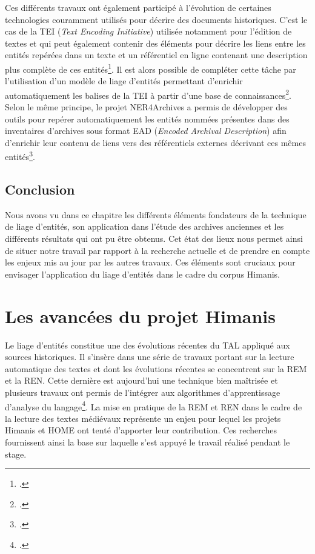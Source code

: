 \documentclass[a4paper,12pt,twoside]{book}
\begin{document}
	Ces différents travaux ont également participé à l'évolution de certaines technologies couramment utilisés pour décrire des documents historiques. C'est le cas de la TEI (\textit{Text Encoding Initiative}) utilisée notamment pour l'édition de textes et qui peut également contenir des éléments pour décrire les liens entre les entités repérées dans un texte et un référentiel en ligne contenant une description plus complète de ces entités\footcite{frontini_annotation_2016}. Il est alors possible de compléter cette tâche par l'utilisation d'un modèle de liage d'entités permettant d'enrichir automatiquement les balises de la TEI à partir d'une base de connaissances\footcite{brando_reden_2016}. Selon le même principe, le projet NER4Archives a permis de développer des outils pour repérer automatiquement les entités nommées présentes dans des inventaires d'archives sous format EAD (\textit{Encoded Archival Description}) afin d'enrichir leur contenu de liens vers des référentiels externes décrivant ces mêmes entités\footcite{clavaud_ner4archives_nodate}.
	
	\section*{Conclusion}
	
	Nous avons vu dans ce chapitre les différents éléments fondateurs de la technique de liage d'entités, son application dans l'étude des archives anciennes et les différents résultats qui ont pu être obtenus. Cet état des lieux nous permet ainsi de situer notre travail par rapport à la recherche actuelle et de prendre en compte les enjeux mis au jour par les autres travaux. Ces éléments sont cruciaux pour envisager l'application du liage d'entités dans le cadre du corpus Himanis.
	
	\chapter{Les avancées du projet Himanis}
	
	Le liage d'entités constitue une des évolutions récentes du TAL appliqué aux sources historiques. Il s'insère dans une série de travaux portant sur la lecture automatique des textes et dont les évolutions récentes se concentrent sur la REM et la REN. Cette dernière est aujourd'hui une technique bien maîtrisée et plusieurs travaux ont permis de l'intégrer aux algorithmes d'apprentissage d'analyse du langage\footcite{suarez_establishing_2020}. La mise en pratique de la REM et REN dans le cadre de la lecture des textes médiévaux représente un enjeu pour lequel les projets Himanis et HOME ont tenté d'apporter leur contribution. Ces recherches fournissent ainsi la base sur laquelle s'est appuyé le travail réalisé pendant le stage.
	
\end{document}

